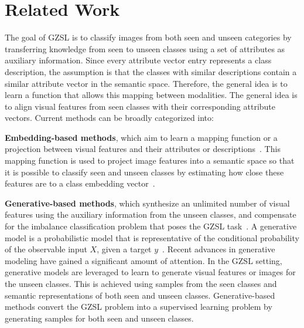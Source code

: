 \section{Related Work}

The goal of GZSL is to classify images from both seen and unseen categories by transferring knowledge from seen to unseen classes using a set of attributes as auxiliary information.
Since every attribute vector entry represents a class description, the assumption is that the classes with similar descriptions contain a similar attribute vector in the semantic space. Therefore, the general idea is to learn a function that allows this mapping between modalities. 
The general idea is to align visual features from seen classes with their corresponding attribute vectors. 
Current methods can be broadly categorized into:

\vspace{0.05in}
\textbf{Embedding-based methods}, which aim to learn a mapping function or a projection between visual features and their attributes or descriptions~\cite{DeViSE, ESZSL, ALE}. This mapping function is used to project image features into a semantic space so that it is possible to classify seen and unseen classes by estimating how close these features are to a class embedding vector~\cite{Rahman2018AUA, Chen2018ZeroShotVR, Shen2020InvertibleZR, 9724125}.

\vspace{0.05in}
\textbf{Generative-based methods}, which synthesize an unlimited number of visual features using the auxiliary information from the unseen classes, and compensate for the imbalance classification problem that poses the GZSL task~\cite{CADA_VAE, tfvaegan, CE}. A generative model is a probabilistic model that is representative of the conditional probability of the observable input $X$, given a target $y$~\cite{VAEs, GANs}. Recent advances in generative modeling have gained a significant amount of attention. In the GZSL setting, generative models are leveraged to learn to generate visual features or images for the unseen classes\cite{Su_2022_CVPR, Kong_2022_CVPR}. This is achieved using samples from the seen classes and semantic representations of both seen and unseen classes. Generative-based methods convert the GZSL problem into a supervised learning problem by generating samples for both seen and unseen classes.


